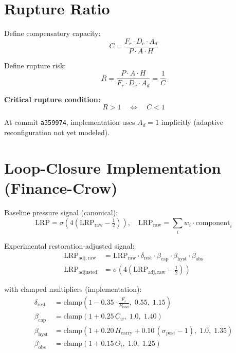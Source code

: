 \documentclass[11pt]{article}
\begin{document}
\section{Rupture Ratio}
Define compensatory capacity:
\begin{equation}
  C = \frac{F_r \cdot D_c \cdot A_d}{P \cdot A \cdot H}
  \label{eq:compensatory}
\end{equation}

Define rupture risk:
\begin{equation}
  R = \frac{P \cdot A \cdot H}{F_r \cdot D_c \cdot A_d} = \frac{1}{C}
  \label{eq:rupture-ratio}
\end{equation}

\textbf{Critical rupture condition:}
\begin{equation}
  R > 1 \quad \Longleftrightarrow \quad C < 1
\end{equation}

At commit \texttt{a359974}, implementation uses $A_d = 1$ implicitly (adaptive reconfiguration not yet modeled).

\section{Loop-Closure Implementation (Finance-Crow)}
Baseline pressure signal (canonical):
\begin{equation}
  \mathrm{LRP} = \sigma\!\left( 4 \left( \mathrm{LRP}_{\mathrm{raw}} - \tfrac{1}{2} \right) \right),
  \quad \mathrm{LRP}_{\mathrm{raw}} = \sum_i w_i \cdot \text{component}_i
\end{equation}

Experimental restoration-adjusted signal:
\begin{align}
  \mathrm{LRP}_{\mathrm{adj,raw}}
  &= \mathrm{LRP}_{\mathrm{raw}} \cdot \delta_{\mathrm{rest}} \cdot \beta_{\mathrm{cap}} \cdot \beta_{\mathrm{hyst}} \cdot \beta_{\mathrm{obs}} \\
  \mathrm{LRP}_{\mathrm{adjusted}}
  &= \sigma\!\left( 4 \left( \mathrm{LRP}_{\mathrm{adj,raw}} - \tfrac{1}{2} \right) \right)
\end{align}

with clamped multipliers (implementation):
\begin{align}
  \delta_{\mathrm{rest}} &= \mathrm{clamp}\!\left(1 - 0.35 \cdot \frac{F_r}{P_{\mathrm{load}}},\; 0.55,\; 1.15\right) \\
  \beta_{\mathrm{cap}} &= \mathrm{clamp}\!\left(1 + 0.25\, C_w,\; 1.0,\; 1.40\right) \\
  \beta_{\mathrm{hyst}} &= \mathrm{clamp}\!\left(1 + 0.20\, H_{\mathrm{carry}} + 0.10\,(\sigma_{\mathrm{post}} - 1),\; 1.0,\; 1.35\right) \\
  \beta_{\mathrm{obs}} &= \mathrm{clamp}\!\left(1 + 0.15\, O_i,\; 1.0,\; 1.25\right)
\end{align}
\end{document}

